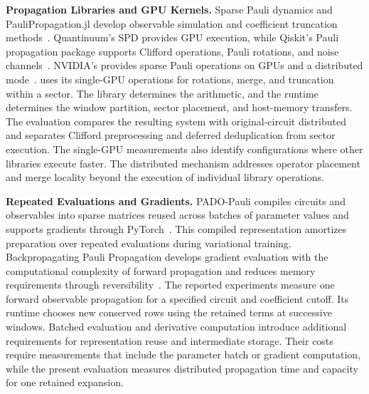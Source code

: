 \noindent\textbf{Propagation Libraries and GPU Kernels.}
Sparse Pauli dynamics and PauliPropagation.jl develop observable simulation and coefficient truncation methods~\cite{begusic2024fast,rudolph2025pauli}.
Quantinuum's SPD provides GPU execution, while Qiskit's Pauli propagation package supports Clifford operations, Pauli rotations, and noise channels~\cite{spd,qiskitpauliprop}.
NVIDIA's \cuPP provides sparse Pauli operations on GPUs and a distributed mode~\cite{cupauliprop}.
\SectorQ uses its single-GPU operations for rotations, merge, and truncation within a sector.
The library determines the arithmetic, and the runtime determines the window partition, sector placement, and host-memory transfers.
The evaluation compares the resulting system with original-circuit distributed \cuPP and separates Clifford preprocessing and deferred deduplication from sector execution.
The single-GPU measurements also identify configurations where other libraries execute faster.
The distributed mechanism addresses operator placement and merge locality beyond the execution of individual library operations.

\noindent\textbf{Repeated Evaluations and Gradients.}
PADO-Pauli compiles circuits and observables into sparse matrices reused across batches of parameter values and supports gradients through PyTorch~\cite{kim2026pado}.
This compiled representation amortizes preparation over repeated evaluations during variational training.
Backpropagating Pauli Propagation develops gradient evaluation with the computational complexity of forward propagation and reduces memory requirements through reversibility~\cite{lin2026backpropagating}.
The reported \SectorQ experiments measure one forward observable propagation for a specified circuit and coefficient cutoff.
Its runtime chooses new conserved rows using the retained terms at successive windows.
Batched evaluation and derivative computation introduce additional requirements for representation reuse and intermediate storage.
Their costs require measurements that include the parameter batch or gradient computation, while the present evaluation measures distributed propagation time and capacity for one retained expansion.
